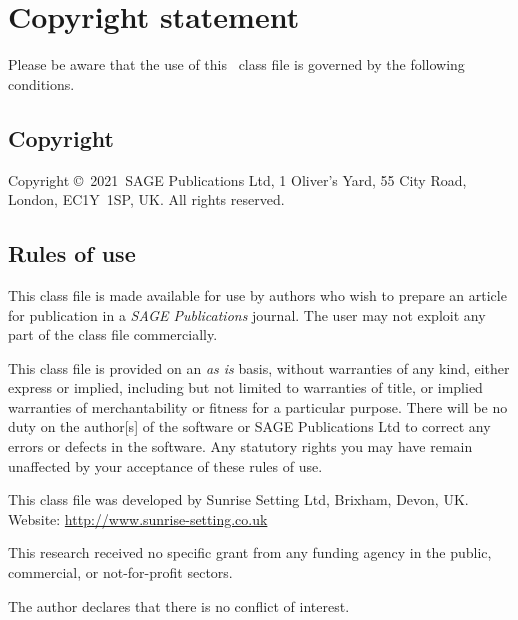 \documentclass[sagev,doublespace,times,Review]{sagej}
\def\volumeyear{2021}
\begin{document}
\section{Copyright statement}
Please  be  aware that the use of  this \LaTeXe\ class file is
governed by the following conditions.

\subsection{Copyright}
Copyright \copyright\ \volumeyear\ SAGE Publications Ltd,
1 Oliver's Yard, 55 City Road, London, EC1Y~1SP, UK. All
rights reserved.

\subsection{Rules of use}
This class file is made available for use by authors who wish to
prepare an article for publication in a \textit{SAGE Publications} journal.
The user may not exploit any
part of the class file commercially.

This class file is provided on an \textit{as is}  basis, without
warranties of any kind, either express or implied, including but
not limited to warranties of title, or implied  warranties of
merchantability or fitness for a particular purpose. There will
be no duty on the author[s] of the software or SAGE Publications Ltd
to correct any errors or defects in the software. Any
statutory  rights you may have remain unaffected by your
acceptance of these rules of use.

\begin{acks}
This class file was developed by Sunrise Setting Ltd,
Brixham, Devon, UK.\\
Website: \url{http://www.sunrise-setting.co.uk}
\end{acks}

\begin{funding}
This research received no specific grant from any funding agency in the public, commercial, or not-for-profit sectors.
\end{funding}

\begin{dci}
	The author declares that there is no conflict of interest.
\end{dci}




%
%
%
\end{document}
